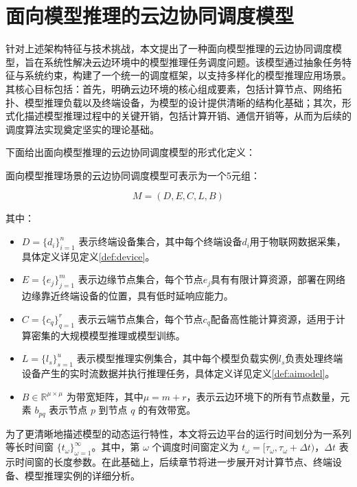 \section{面向模型推理的云边协同调度模型}

针对上述架构特征与技术挑战，本文提出了一种面向模型推理的云边协同调度模型，旨在系统性解决云边环境中的模型推理任务调度问题。该模型通过抽象任务特征与系统约束，构建了一个统一的调度框架，以支持多样化的模型推理应用场景。其核心目标包括：首先，明确云边环境的核心组成要素，包括计算节点、网络拓扑、模型推理负载以及终端设备，为模型的设计提供清晰的结构化基础；其次，形式化描述模型推理过程中的关键开销，包括计算开销、通信开销等，从而为后续的调度算法实现奠定坚实的理论基础。

下面给出面向模型推理的云边协同调度模型的形式化定义：

\begin{definition}[面向模型推理的云边协同调度模型]
面向模型推理场景的云边协同调度模型可表示为一个5元组：
\end{definition}

$$
M = (D, E, C, L, B)
$$

其中：

\begin{itemize}
    \item $D = \{d_i\}_{i=1}^n$ 表示终端设备集合，其中每个终端设备$d_i$用于物联网数据采集，具体定义详见定义\ref{def:device}。
    \item $E = \{e_j\}_{j=1}^m$ 表示边缘节点集合，每个节点$e_j$具有有限计算资源，部署在网络边缘靠近终端设备的位置，具有低时延响应能力。
    \item $C = \{c_q\}_{q=1}^r$ 表示云端节点集合，每个节点$c_q$配备高性能计算资源，适用于计算密集的大规模模型推理或模型训练。
    \item $L = \{l_s\}_{s=1}^u$ 表示模型推理实例集合，其中每个模型负载实例$l_s$负责处理终端设备产生的实时流数据并执行推理任务，具体定义详见定义\ref{def:aimodel}。
    \item $B \in \mathbb{R}^{\mu \times \mu}$ 为带宽矩阵，其中$\mu=m+r$，表示云边环境下的所有节点数量，元素 $b_{pq}$ 表示节点 $p$ 到节点 $q$ 的有效带宽。
\end{itemize}

为了更清晰地描述模型的动态运行特性，本文将云边平台的运行时间划分为一系列等长时间窗 $\{t_\omega\}_{\omega=1}^\infty$。其中，第 $\omega$ 个调度时间窗定义为 $t_\omega = [\tau_\omega, \tau_\omega + \Delta t)$，$\Delta t$ 表示时间窗的长度参数。在此基础上，后续章节将进一步展开对计算节点、终端设备、模型推理实例的详细分析。

